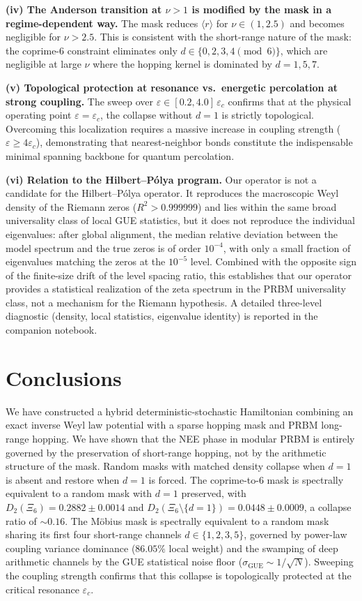 \documentclass[11pt,a4paper]{article}
\begin{document}
\textbf{(iv) The Anderson transition at $\nu > 1$ is modified by the mask in a regime-dependent way.} The mask reduces $\langle r \rangle$ for $\nu \in (1, 2.5)$ and becomes negligible for $\nu > 2.5$. This is consistent with the short-range nature of the mask: the coprime-6 constraint eliminates only $d \in \{0, 2, 3, 4 \pmod 6\}$, which are negligible at large $\nu$ where the hopping kernel is dominated by $d = 1, 5, 7$.

\textbf{(v) Topological protection at resonance vs.\ energetic percolation at strong coupling.} The sweep over $\varepsilon \in [0.2, 4.0]\,\varepsilon_c$ confirms that at the physical operating point $\varepsilon = \varepsilon_c$, the collapse without $d=1$ is strictly topological. Overcoming this localization requires a massive increase in coupling strength ($\varepsilon \ge 4\varepsilon_c$), demonstrating that nearest-neighbor bonds constitute the indispensable minimal spanning backbone for quantum percolation.

\textbf{(vi) Relation to the Hilbert--Pólya program.} Our operator is
not a candidate for the Hilbert--Pólya operator. It reproduces the
macroscopic Weyl density of the Riemann zeros ($R^2 > 0.999999$) and
lies within the same broad universality class of local GUE statistics,
but it does not reproduce the individual eigenvalues: after global
alignment, the median relative deviation between the model spectrum
and the true zeros is of order $10^{-4}$, with only a small fraction
of eigenvalues matching the zeros at the $10^{-5}$ level. Combined with
the opposite sign of the finite-size drift of the level spacing ratio,
this establishes that our operator provides a statistical realization
of the zeta spectrum in the PRBM universality class, not a mechanism
for the Riemann hypothesis. A detailed three-level diagnostic (density,
local statistics, eigenvalue identity) is reported in the companion
notebook.

\section{Conclusions}
\label{sec:conclusions}

We have constructed a hybrid deterministic-stochastic Hamiltonian combining an exact inverse Weyl law potential with a sparse hopping mask and PRBM long-range hopping. We have shown that the NEE phase in modular PRBM is entirely governed by the preservation of short-range hopping, not by the arithmetic structure of the mask. Random masks with matched density collapse when $d = 1$ is absent and restore when $d = 1$ is forced. The coprime-to-6 mask is spectrally equivalent to a random mask with $d = 1$ preserved, with $D_2(\Xi_6) = 0.2882 \pm 0.0014$ and $D_2(\Xi_6 \setminus \{d=1\}) = 0.0448 \pm 0.0009$, a collapse ratio of $\sim 0.16$. The M\"obius mask is spectrally equivalent to a random mask sharing its first four short-range channels $d \in \{1, 2, 3, 5\}$, governed by power-law coupling variance dominance ($86.05\%$ local weight) and the swamping of deep arithmetic channels by the GUE statistical noise floor ($\sigma_{\text{GUE}} \sim 1/\sqrt{N}$). Sweeping the coupling strength confirms that this collapse is topologically protected at the critical resonance $\varepsilon_c$.
\end{document}
